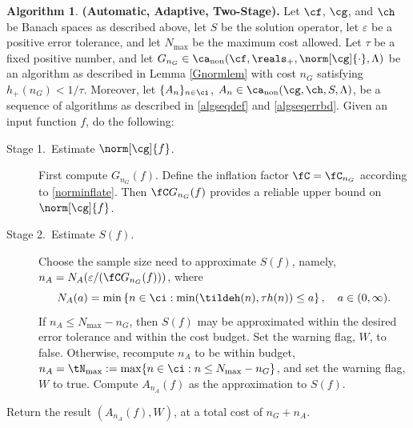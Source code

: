 \documentclass[]{elsarticle}
\DeclareMathOperator{\fix}{non}
\theoremstyle{definition}
\newtheorem{algo}{Algorithm}
\theoremstyle{remark}
\begin{document}
\begin{algo} \label{twostagedetalgo} {\bf (Automatic, Adaptive, Two-Stage).} Let $\cf$, $\cg$, and $\ch$ be Banach spaces as described above, let $S$ be the solution operator, let $\varepsilon$ be a positive error tolerance, and let $N_{\max}$ be the maximum cost allowed.  Let $\tau$ be a fixed positive number, and let $G_{n_G} \in \ca_{\fix}(\cf,\reals_+,\norm[\cg]{\cdot},\Lambda)$ be an algorithm as described in Lemma \ref{Gnormlem} with cost $n_G$ satisfying $h_{+}(n_G) < 1/\tau$.
Moreover, let  $\{A_n\}_{n \in \ci}$, $A_n  \in \ca_{\fix}(\cg,\ch,S,\Lambda)$, be a sequence of algorithms as described in  \eqref{algseqdef} and \eqref{algseqerrbd}.  Given an input function $f$, do the following:

\begin{description} 

\item[Stage 1.\ Estimate {$\norm[\cg]{f}$}.] First compute $G_{n_G}(f)$.  Define the inflation factor $\fC=\fC_{n_G}$ according to \eqref{norminflate}.
Then $\fC G_{n_G}(f)$ provides a reliable upper bound on $\norm[\cg]{f}$.  

\item [Stage 2.\ Estimate {$S(f)$}.] Choose the sample size need to approximate $S(f)$, namely, $n_A=N_{A}(\varepsilon/(\fC G_{n_G}(f)))$, where 
\begin{equation} \label{Nmindef}
N_{A}(a)= \min\left\{ n \in \ci : \min(\tildeh(n),\tau h(n)) \le a \right\}, \quad a \in (0,\infty).
\end{equation}
If $n_A \le N_{\max}-n_G$, then $S(f)$ may be approximated within the desired error tolerance and within the cost budget.  Set the warning flag, $W$, to false. Otherwise, recompute $n_A$ to be within budget, $n_A = \tN_{\max} := \max\{n \in \ci : n\le N_{\max} -  n_G\}$, and set the warning flag, $W$ to true.  Compute $A_{n_A}(f)$ as the approximation to $S(f)$.
\end{description}

Return the result $(A_{n_A}(f),W)$, at a total cost of $n_G+n_A$.  
\end{algo}
\end{document}
